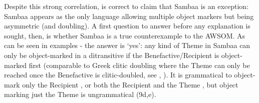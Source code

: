 \documentclass[output=paper
,modfonts
,nonflat]{langsci/langscibook}
\begin{document}
Despite this strong correlation, \citet{Riedel2009} is correct to claim that Sambaa is an exception: Sambaa appears as the only language allowing multiple object markers but being asymmetric (and doubling). A first question to answer before any explanation is sought, then, is whether Sambaa is a true counterexample to the AWSOM. As can be seen in examples - the answer is ‘yes’: any kind of Theme in Sambaa can only be object-marked in a ditransitive if the Benefactive/Recipient is object-marked first (comparable to Greek clitic doubling where the Theme can only be reached once the Benefactive is clitic-doubled, see \citealt{Anagnostopoulou2003}, \citealt{Anagnostopoulou2014}).
It is grammatical to object-mark only the Recipient , or both the Recipient and the Theme , but object marking just the Theme is ungrammatical (9d,e).
\end{document}
